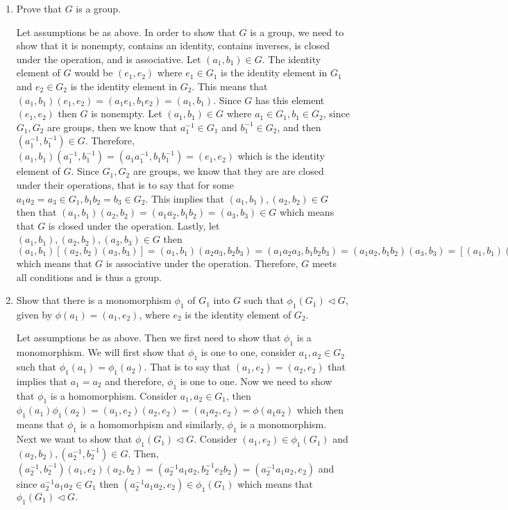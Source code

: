 \documentclass[11pt]{article}
\begin{document}
\begin{enumerate}
\begin{enumerate}
    \item Prove that $G$ is a group.
    
    Let assumptions be as above. In order to show that $G$ is a group, we need to show that it is nonempty, contains an identity, contains inverses, is closed under the operation, and is associative. Let $(a_1, b_1)\in G$. The identity element of $G$ would be $(e_1, e_2)$ where $e_1\in G_1$ is the identity element in $G_1$ and $e_2\in G_2$ is the identity element in $G_2$. This means that $(a_1, b_1)(e_1, e_2) = (a_1 e_1, b_1 e_2) = (a_1, b_1)$. Since $G$ has this element $(e_1, e_2)$ then $G$ is nonempty. Let $(a_1, b_1)\in G$ where $a_1\in G_1, b_1\in G_2$, since $G_1, G_2$ are groups, then we know that $a_1^{-1}\in G_1$ and $b_1^{-1}\in G_2$, and then $(a_1^{-1}, b_1^{-1})\in G$. Therefore, $(a_1, b_1)(a_1^{-1}, b_1^{-1}) = (a_1 a_1^{-1}, b_1b_1^{-1}) = (e_1, e_2)$ which is the identity element of $G$. Since $G_1, G_2$ are groups, we know that they are are closed under their operations, that is to say that for some $a_1a_2=a_3\in G_1, b_1b_2=b_3\in G_2$. This implies that $(a_1, b_1),(a_2,b_2)\in G$ then that $(a_1,b_1)(a_2,b_2) = (a_1a_2, b_1b_2) = (a_3, b_3)\in G$ which means that $G$ is closed under the operation. Lastly, let $(a_1,b_1), (a_2, b_2), (a_3, b_3)\in G$ then $(a_1, b_1)[(a_2, b_2)(a_3, b_3)] = (a_1, b_1)(a_2a_3, b_2b_3) = (a_1a_2a_3, b_1b_2b_3) = (a_1a_2, b_1b_2)(a_3, b_3)= [(a_1, b_1)(a_2, b_2)](a_3,b_3)$ which means that $G$ is associative under the operation. Therefore, $G$ meets all conditions and is thus a group.
    
    \item Show that there is a monomorphism $\phi_1$ of $G_1$ into $G$ such that $\phi_1(G_1)\triangleleft G$, given by $\phi(a_1) = (a_1, e_2)$, where $e_2$ is the identity element of $G_2$.
    
    Let assumptions be as above. Then we first need to show that $\phi_1$ is a monomorphism. We will first show that $\phi_1$ is one to one, consider $a_1, a_2\in G_2$ such that $\phi_1(a_1) = \phi_1(a_2).$ That is to say that $(a_1, e_2) = (a_2, e_2)$ that implies that $a_1 = a_2$ and therefore, $\phi_1$ is one to one. Now we need to show that $\phi_1$ is a homomorphism. Consider $a_1, a_2\in G_1$, then $\phi_1(a_1)\phi_1(a_2) = (a_1,e_2)(a_2, e_2) = (a_1 a_2, e_2) = \phi(a_1a_2)$ which then means that $\phi_1$ is a homomorhpism and similarly, $\phi_1$ is a monomorphism. Next we want to show that $\phi_1(G_1) \triangleleft G.$ Consider $(a_1, e_2)\in \phi_1(G_1)$ and $(a_2, b_2), (a_2^{-1}, b_2^{-1})\in G$. Then, $(a_2^{-1}, b_2^{-1})(a_1, e_2)(a_2,b_2) = (a_2^{-1}a_1a_2, b_2^{-1}e_2b_2) = (a_2^{-1}a_1a_2, e_2)$ and since $a_2^{-1}a_1a_2\in G_1$ then $(a_2^{-1}a_1a_2, e_2)\in \phi_1(G_1)$ which means that $\phi_1(G_1)\triangleleft G.$
    

\end{enumerate}
\end{enumerate}
\end{document}
